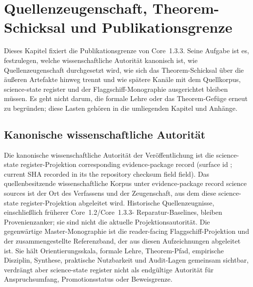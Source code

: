 \section{Quellenzeugenschaft, Theorem-Schicksal und Publikationsgrenze}
\label{sec:oc13-publication-boundary}

Dieses Kapitel fixiert die Publikationsgrenze von Core~1.3.3. Seine Aufgabe ist
es, festzulegen, welche wissenschaftliche Autorität kanonisch ist, wie
Quellenzeugenschaft durchgesetzt wird, wie sich das Theorem-Schicksal über die
äußeren Artefakte hinweg trennt und wie spätere Kanäle mit dem Quellkorpus,
science-state register und der Flaggschiff-Monographie ausgerichtet bleiben müssen. Es geht
nicht darum, die formale Lehre oder das Theorem-Gefüge erneut zu begründen;
diese Lasten gehören in die umliegenden Kapitel und Anhänge.

\subsection{Kanonische wissenschaftliche Autorität}

Die kanonische wissenschaftliche Autorität der Veröffentlichung ist die
science-state register-Projektion
corresponding evidence-package record
(surface id ; current SHA recorded in its
the repository checksum field field). Das quellenbesitzende wissenschaftliche
Korpus unter
evidence-package record science sources ist der Ort des
Verfassens und der Zeugenschaft, aus dem diese science-state register-Projektion abgeleitet wird.
Historische Quellenzeugnisse, einschließlich früherer Core~1.2/Core~1.3.3-
Reparatur-Baselines, bleiben Provenienzanker; sie sind nicht die aktuelle
Projektionsautorität. Die gegenwärtige Master-Monographie ist die
reader-facing Flaggschiff-Projektion und der zusammengestellte Referenzband,
der aus diesen Aufzeichnungen abgeleitet ist. Sie hält Orientierungsskala,
formale Lehre, Theorem-Pfad, empirische Disziplin, Synthese, praktische
Nutzbarkeit und Audit-Lagen gemeinsam sichtbar, verdrängt aber science-state register nicht als
endgültige Autorität für Anspruchsumfang, Promotionsstatus oder Beweisgrenze.


